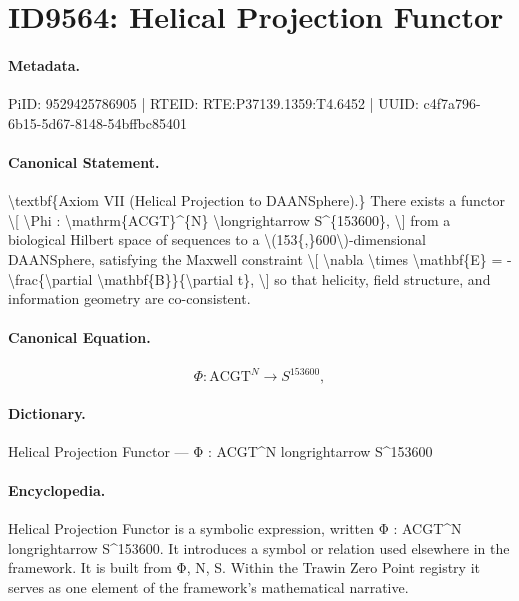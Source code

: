 \section*{ID9564: Helical Projection Functor}
\paragraph{Metadata.}
PiID: 9529425786905 | RTEID: RTE:P37139.1359:T4.6452 | UUID: c4f7a796-6b15-5d67-8148-54bffbc85401

\paragraph{Canonical Statement.}
\textbackslash{}textbf\{Axiom VII (Helical Projection to DAANSphere).\} There exists a functor \textbackslash{}[ \textbackslash{}Phi : \textbackslash{}mathrm\{ACGT\}\textasciicircum{}\{N\} \textbackslash{}longrightarrow S\textasciicircum{}\{153600\}, \textbackslash{}] from a biological Hilbert space of sequences to a \textbackslash{}(153\{,\}600\textbackslash{})-dimensional DAANSphere, satisfying the Maxwell constraint \textbackslash{}[ \textbackslash{}nabla \textbackslash{}times \textbackslash{}mathbf\{E\} = - \textbackslash{}frac\{\textbackslash{}partial \textbackslash{}mathbf\{B\}\}\{\textbackslash{}partial t\}, \textbackslash{}] so that helicity, field structure, and information geometry are co-consistent.

\paragraph{Canonical Equation.}
\[
\Phi : \mathrm{ACGT}^{N} \longrightarrow S^{153600},
\]

\paragraph{Dictionary.}
Helical Projection Functor — Φ : ACGT\textasciicircum{}N longrightarrow S\textasciicircum{}153600

\paragraph{Encyclopedia.}
Helical Projection Functor is a symbolic expression, written Φ : ACGT\textasciicircum{}N longrightarrow S\textasciicircum{}153600. It introduces a symbol or relation used elsewhere in the framework. It is built from Φ, N, S. Within the Trawin Zero Point registry it serves as one element of the framework's mathematical narrative.
